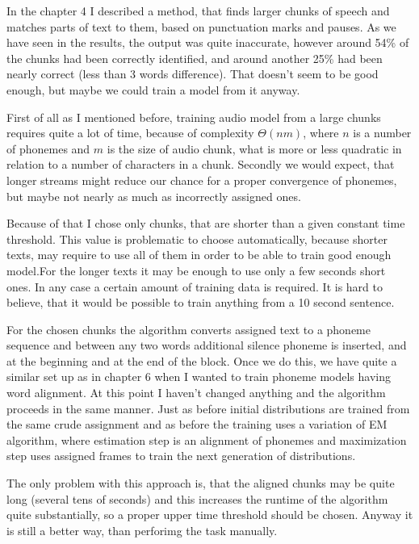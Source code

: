 \documentclass[12pt,a4paper,english]{article}
\begin{document}
In the chapter 4 I described a method, that finds larger chunks of speech and matches parts of text to them, based on punctuation marks and pauses. As we have seen in the results, the output was quite inaccurate, however around 54\% of the chunks had been correctly identified, and around another 25\% had been nearly correct (less than 3 words difference). That doesn't seem to be good enough, but maybe we could train a model from it anyway. \newline

First of all as I mentioned before, training audio model from a large chunks requires quite a lot of time, because of complexity $\Theta(nm)$, where $n$ is a number of phonemes and $m$ is the size of audio chunk, what is more or less quadratic in relation to a number of characters in a chunk. \newline
Secondly we would expect, that longer streams might reduce our chance for a proper convergence of phonemes, but maybe not nearly as much as incorrectly assigned ones. \newline

Because of that I chose only chunks, that are shorter than a given constant time threshold. This value is problematic to choose automatically, because shorter texts, may require to use all of them in order to be able to train good enough model.For the longer texts it may be enough to use only a few seconds short ones.
In any case a certain amount of training data is required. It is hard to believe, that it would be possible to train anything from a 10 second sentence. \newline

For the chosen chunks the algorithm converts assigned text to a phoneme sequence and between any two words additional silence phoneme is inserted, and at the beginning and at the end of the block. \newline
Once we do this, we have quite a similar set up as in chapter 6 when I wanted to train phoneme models having word alignment. At this point I haven't changed anything and the algorithm proceeds in the same manner. \newline
Just as before initial distributions are trained from the same crude assignment and as before the training uses a variation of EM algorithm, where estimation step is an alignment of phonemes and maximization step uses assigned frames to train the next generation of distributions. \newline

The only problem with this approach is, that the aligned chunks may be quite long (several tens of seconds) and this increases the runtime of the algorithm quite substantially, so a proper upper time threshold should be chosen. Anyway it is still a better way, than perforimg the task manually.
\end{document}

